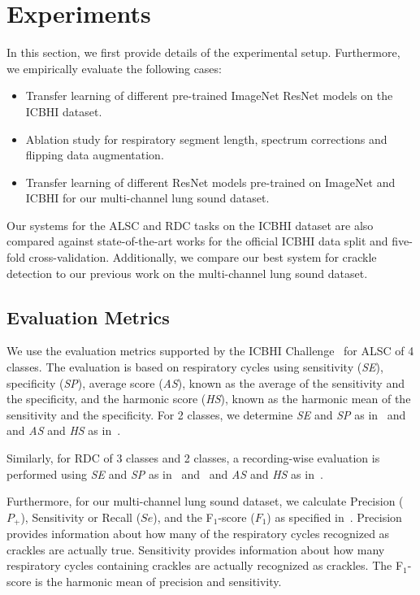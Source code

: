 \documentclass[journal]{IEEEtran}
\begin{document}
\section{Experiments}
\label{sec:experiments}
In this section, we first provide details of the experimental setup. Furthermore, we empirically evaluate the following cases:
\begin{itemize}
    \item Transfer learning of different pre-trained ImageNet ResNet models on the ICBHI dataset.
	\item Ablation study for respiratory segment length, spectrum corrections and flipping data augmentation.
	\item Transfer learning of different ResNet models pre-trained on ImageNet and ICBHI for our multi-channel lung sound dataset.
\end{itemize}
Our systems for the ALSC and RDC tasks on the ICBHI dataset are also compared against state-of-the-art works for the official ICBHI data split and five-fold cross-validation. Additionally, we compare our best system for crackle detection to our previous work on the multi-channel lung sound dataset.

\subsection{Evaluation Metrics}
We use the evaluation metrics supported by the ICBHI Challenge~\cite{rocha2018alpha} for ALSC of 4 classes. The evaluation is based on respiratory cycles using sensitivity (\textit{SE}), specificity (\textit{SP}), average score (\textit{AS}), known as the average of the sensitivity and the specificity, and the harmonic score (\textit{HS}), known as the harmonic mean of the sensitivity and the specificity. For 2 classes, we determine \textit{SE} and \textit{SP} as in~\cite{dPerna2019lstm} and~\cite{pham2021cnn} and \textit{AS} and \textit{HS} as in~\cite{rocha2018alpha}.   

Similarly, for RDC of 3 classes and 2 classes, a recording-wise evaluation is performed using \textit{SE} and \textit{SP} as in~\cite{dPerna2019lstm} and~\cite{pham2021cnn} and \textit{AS} and \textit{HS} as in~\cite{rocha2018alpha}.   

Furthermore, for our multi-channel lung sound dataset, we calculate Precision ($P_+$), Sensitivity or Recall ($Se$), and the F$_1$-score ($F_1$) as specified in~\cite{messner2018crackle}.
Precision  provides information about how many of the respiratory cycles recognized as crackles are actually true. Sensitivity  provides information about how many respiratory cycles containing crackles are actually recognized as crackles. The F$_1$-score is the harmonic mean of precision and sensitivity.
\end{document}
